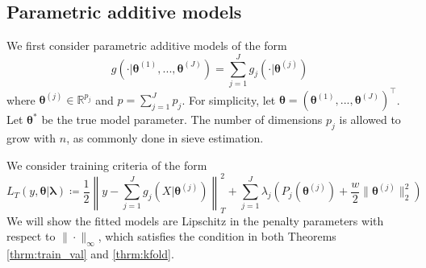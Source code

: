 \documentclass[12pt]{article}
\DeclareMathOperator*{\argmin}{arg\,min}
\begin{document}
\subsection{Parametric additive models}
\label{sec:param_add_models}

We first consider parametric additive models of the form
\begin{equation}
g(\cdot | \boldsymbol{\theta}^{(1)}, ..., \boldsymbol{\theta}^{(J)}) = \sum_{j=1}^J g_j(\cdot | \boldsymbol{\theta}^{(j)})
\end{equation}
where $\boldsymbol{\theta}^{(j)} \in \mathbb{R}^{p_j}$ and $p = \sum_{j=1}^J p_j$. For simplicity, let $\boldsymbol{\theta} = \left (\boldsymbol{\theta}^{(1)}, ..., \boldsymbol{\theta}^{(J)} \right )^\top$. Let $\boldsymbol{\theta}^*$ be the true model parameter. The number of dimensions $p_j$ is allowed to grow with $n$, as commonly done in sieve estimation. 

We consider training criteria of the form
\begin{equation}
\label{eq:param_add}
L_T \left (y, \boldsymbol{\theta} | \boldsymbol{\lambda} \right) 
\coloneqq \frac{1}{2} \left  \| y -  \sum_{j=1}^J g_j(X| \boldsymbol{\theta}^{(j)}) \right \|^2_T 
+ \sum_{j=1}^J \lambda_j \left ( P_j(\boldsymbol{\theta}^{(j)}) + \frac{w}{2} \| \boldsymbol{\theta}^{(j)} \|^2_2 \right )
\end{equation}
We will show the fitted models are Lipschitz in the penalty parameters with respect to $\| \cdot \|_\infty$, which satisfies the condition in both Theorems \ref{thrm:train_val} and \ref{thrm:kfold}.

\end{document}
